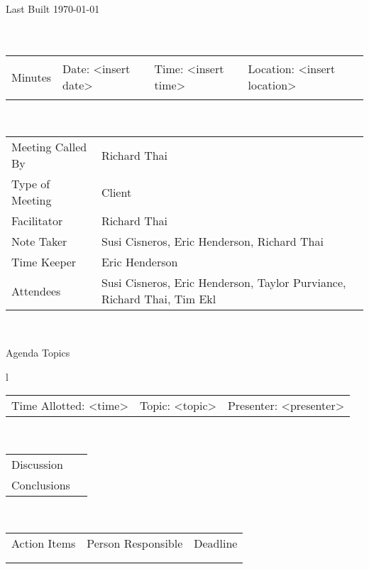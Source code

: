 \documentclass{article}
\begin{document}
Last Built \today\\
~\\
~\\
\begin{tabular}{llll}
\begin{large}Minutes\end{large} & Date: {\textless}insert date{\textgreater} & Time: {\textless}insert time{\textgreater} & Location: {\textless}insert location{\textgreater}
\end{tabular}
~\\
\begin{tabular}{ll}
Meeting Called By & Richard Thai\\
Type of Meeting & Client\\
Facilitator & Richard Thai\\
Note Taker & Susi Cisneros, Eric Henderson, Richard Thai\\
Time Keeper & Eric Henderson\\
Attendees & Susi Cisneros, Eric Henderson, Taylor Purviance, Richard Thai, Tim Ekl\\
\end{tabular}
~\\
\begin{center}
\begin{large}Agenda Topics\end{large}
\end{center}
\begin{tabular}{l}
\begin{tabular}{lll}
Time Allotted: {\textless}time{\textgreater} & Topic: {\textless}topic{\textgreater} & Presenter: {\textless}presenter{\textgreater}
\end{tabular}\\
\begin{tabular}{ll}
Discussion & \\
Conclusions &
\end{tabular}\\
\begin{tabular}{lll}
Action Items & Person Responsible & Deadline\\
 & & \\
 & & \\
\end{tabular}
\end{tabular}
\end{document}
